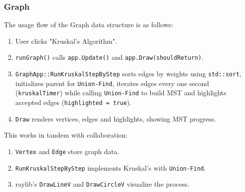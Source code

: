 \documentclass{article}
\begin{document}
\subsubsection{Graph}
The usage flow of the Graph data structure is as follows:
\begin{enumerate}
	\item User clicks "Kruskal's Algorithm".
	\item \lstinline|runGraph()| calls \lstinline|app.Update()| and \lstinline|app.Draw(shouldReturn)|.
	\item \lstinline|GraphApp::RunKruskalStepByStep| sorts edges by weights using \lstinline|std::sort|, initializes parent for \lstinline|Union-Find|, iterates edges every one second (\lstinline|kruskalTimer|) while calling \lstinline|Union-Find| to build MST and highlights accepted edges (\lstinline|highlighted = true|).
	\item \lstinline|Draw| renders vertices, edges and highlights, showing MST progress.
\end{enumerate}
This works in tandem with collaboration:
\begin{enumerate}
	\item \lstinline|Vertex| and \lstinline|Edge| store graph data.
	\item \lstinline|RunKruskalStepByStep| implements Kruskal's with \lstinline|Union-Find|.
	\item raylib's \lstinline|DrawLineV| and \lstinline|DrawCircleV| visualize the process.
\end{enumerate}
\end{document}
